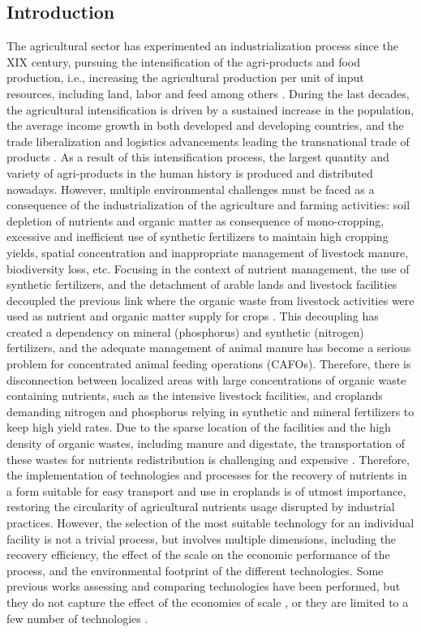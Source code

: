 \begin{refsection}[referencesCh6]
\section{Introduction}
The agricultural sector has experimented an industrialization process since the XIX century, pursuing the intensification of the agri-products and food production, i.e., increasing the agricultural production per unit of input resources, including land, labor and feed among others \citep{FAOethics2004}. During the last decades, the agricultural intensification is driven by a sustained increase in the population, the average income growth in both developed and developing countries, and the trade liberalization and logistics advancements leading the transnational trade of products \citep{baker2014trends}. As a result of this intensification process, the largest quantity and variety of agri-products in the human history is produced and distributed nowadays. However, multiple environmental challenges must be faced as a consequence of the industrialization of the agriculture and farming activities: soil depletion of nutrients and organic matter as consequence of mono-cropping, excessive and inefficient use of synthetic fertilizers to maintain high cropping yields, spatial concentration and inappropriate management of livestock manure, biodiversity loss, etc. 
Focusing in the context of nutrient management, the use of synthetic fertilizers, and the detachment of arable lands and livestock facilities decoupled the previous link where the organic waste from livestock activities were used as nutrient and organic matter supply for crops \citep{bouwman2009human}. This decoupling has created a dependency on mineral (phosphorus) and synthetic (nitrogen) fertilizers, and the adequate management of animal manure has become a serious problem for concentrated animal feeding operations (CAFOs). Therefore, there is disconnection between localized areas with large concentrations of organic waste containing nutrients, such as the intensive livestock facilities, and croplands demanding nitrogen and phosphorus
relying in synthetic and mineral fertilizers to keep high yield rates. Due to the sparse location of the facilities and the high density of organic wastes, including manure and digestate, the transportation of these wastes for nutrients redistribution is challenging and expensive \citep{sampat2018technologies}. Therefore, the implementation of technologies and processes for the recovery of nutrients in a form suitable for easy transport and use in croplands is of utmost importance, restoring the circularity of agricultural nutrients usage disrupted by industrial practices. However, the selection of the most suitable technology for an individual facility is not a trivial process, but involves multiple dimensions, including the recovery efficiency, the effect of the scale on the economic performance of the process, and the environmental footprint of the different technologies. Some previous works assessing and comparing technologies have been performed, but they do not capture the effect of the economies of scale \citep{munasinghe2020nitrogen, de2019resource}, or they are limited to a few number of technologies \citep{bolzonella2018nutrients}.

\end{refsection}
